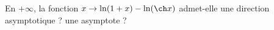 En $+\infty$, la fonction $x\rightarrow \ln(1+x)-\ln(\ch x)$ admet-elle une direction asymptotique ? une asymptote ?\bigskip\newline